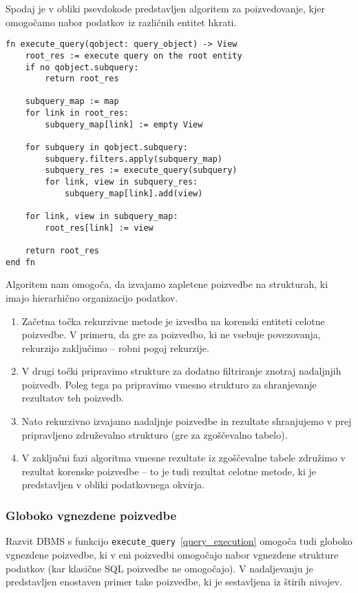 \documentclass[a4paper,12pt,openright]{book}
\begin{document}
\begin{itemize}
        Spodaj je v obliki psevdokode predstavljen algoritem za poizvedovanje, kjer omogočamo nabor podatkov iz različnih entitet hkrati.

\begin{verbatim}
fn execute_query(qobject: query_object) -> View
    root_res := execute query on the root entity
    if no qobject.subquery:
        return root_res

    subquery_map := map
    for link in root_res:
        subquery_map[link] := empty View

    for subquery in qobject.subquery:
        subquery.filters.apply(subquery_map)
        subquery_res := execute_query(subquery)
        for link, view in subquery_res:
            subquery_map[link].add(view)

    for link, view in subquery_map:
        root_res[link] := view

    return root_res
end fn
\end{verbatim}

        \noindent
        Algoritem nam omogoča, da izvajamo zapletene poizvedbe na strukturah, ki imajo hierarhično organizacijo podatkov. 

        \begin{enumerate}
            \item Začetna točka rekurzivne metode je izvedba na korenski entiteti celotne poizvedbe. V primeru, da gre za poizvedbo, ki ne vsebuje povezovanja, rekurzijo zaključimo – robni pogoj rekurzije.
            \item V drugi točki pripravimo strukture za dodatno filtriranje znotraj nadaljnjih poizvedb. Poleg tega pa pripravimo vmesno strukturo za shranjevanje rezultatov teh poizvedb.
            \item Nato rekurzivno izvajamo nadaljnje poizvedbe in rezultate shranjujemo v prej pripravljeno združevalno strukturo (gre za zgoščevalno tabelo).
            \item V zaključni fazi algoritma vmesne rezultate iz zgoščevalne tabele združimo v rezultat korenske poizvedbe – to je tudi rezultat celotne metode, ki je predstavljen v obliki podatkovnega okvirja.
        \end{enumerate}

        \subsubsection{Globoko vgnezdene poizvedbe}

        Razvit DBMS s funkcijo {\tt execute\_query}~\ref{query_execution} omogoča tudi globoko vgnezdene poizvedbe, ki v eni poizvedbi omogočajo nabor vgnezdene strukture podatkov (kar klasične SQL poizvedbe ne omogočajo). V nadaljevanju je predstavljen enostaven primer take poizvedbe, ki je sestavljena iz štirih nivojev.


\end{itemize}
\end{document}
